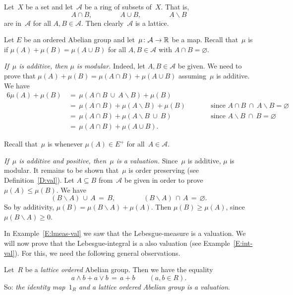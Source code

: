 \documentclass[main.tex]{subfiles}
\begin{document}
\begin{ex}
\label{E:ring-val}
Let~$X$ be a set and let~$\mathcal{A}$ be a ring of subsets of~$X$.
That is,
\begin{equation*}
A\cap B,\qquad\qquad A\cup B,\qquad\qquad A\backslash B
\end{equation*}
are in~$\mathcal{A}$ for all $A,B\in\mathcal{A}$.
Then clearly~$\mathcal{A}$ is a lattice.

Let $E$ be an ordered Abelian group
and let~$\mu\colon \mathcal{A}\rightarrow \mathbb{R}$ be a map.
Recall that~$\mu$ is  if $\mu(A) + \mu(B) = \mu(A\cup B)$
for all $A,B\in\mathcal{A}$ with $A\cap B=\varnothing$.

\emph{If~$\mu$ is additive,
then $\mu$ is modular.}
Indeed,
let $A,B\in \mathcal{A}$ be given. We need to prove that
$\mu(A) + \mu(B) =\mu(A\cap B) + \mu(A\cup B)$
assuming~$\mu$ is additive.
We have
\begin{alignat*}{6}
\mu(A) + \mu(B) \,
  & =\, \mu(A\cap B \ \cup\ A\backslash B) + \mu(B) \\ 
  & =\, \mu(A\cap B) + \mu(A\backslash B)  + \mu(B)\qquad
    && \text{since } A\cap B \ \cap\ A\backslash B = \varnothing \\ 
  & =\, \mu(A\cap B) + \mu(A\backslash B \ \cup\ B ) 
    && \text{since } A\backslash B\ \cap\ B = \varnothing \\
  & =\, \mu(A\cap B) + \mu(A\cup B).
\end{alignat*}

Recall that~$\mu$ is  whenever
$\mu(A)\in E^+$ for all~$A\in\mathcal{A}$.

\emph{If~$\mu$ is additive and positive,
then~$\mu$ is a valuation.}
Since~$\mu$ is additive,
$\mu$ is modular.
It remains to be shown that~$\mu$ is order preserving
(see Definition~\ref{D:val}).
Let $A\subseteq B$ from~$\mathcal{A}$ be given
in order to prove $\mu(A)\leq \mu(B)$.
We have
\begin{equation*}
(B\backslash A)\,\cup\, A\,=\,B,\qquad\qquad 
(B\backslash A)\,\cap\, A\,=\,\varnothing.
\end{equation*}
So by additivity, 
$\mu(B)=\mu(B\backslash A)+\mu(A)$.
Then $\mu(B)\geq \mu(A)$, since $\mu(B\backslash A)\geq 0$.
\end{ex}

In Example~\ref{E:lmeas-val}
we saw that the Lebesgue-measure is a valuation.
We will now prove that the Lebesgue-integral is a also valuation
(see Example~\ref{E:int-val}).
For this,
we need the following general observations.
\begin{ex}
\label{E:1-valuation}
Let~$R$ be a \emph{lattice ordered} Abelian group.
Then we have the equality
\begin{equation*}
a\wedge b  + a\vee b \,=\, a+b \qquad(a,b\in R).
\end{equation*}
So: \emph{the identity map~$1_R$
and a lattice ordered Abelian group is a valuation}.
\end{ex}
\end{document}
